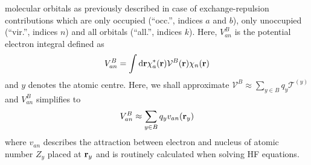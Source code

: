 \documentclass[b5paper,oneside,fleqn,11pt]{book}
\begin{document}
\begin{refsection}
{molecular orbitals as previously described in case of exchange\hyp{}repulsion
contributions}
which are only occupied (``occ.'', indices $a$ and $b$),
only unoccupied (``vir.'', indices $n$) and all orbitals (``all.'', indices $k$).
Here, $V_{an}^{B}$ is the potential electron integral
defined as
%
\begin{equation}  
  V_{an}^{B} =  \int {\rm d}{\bf r} \chi_a^{*} ({\bf r}) \mathcal{V}^{B}({\bf r}) \chi_n ({\bf r})
\end{equation}
%
and $y$ denotes the atomic centre.
Here, we shall approximate $\mathcal{V}^{B}\approx \sum_{y\in B} q_y \mathcal{T}^{(y)}$
and $V_{an}^{B}$ simplifies to
%
\begin{equation}  \label{e:ct-v-qy}
  V_{an}^{B} \approx \sum_{y\in B} q_y v_{an}({\bf r}_y)
\end{equation}
%
where $v_{an}$ describes the attraction between electron and nucleus
of atomic number $Z_y$ placed at ${\bf r}_y$ and
is routinely calculated when solving
HF equations.


\end{refsection}
\end{document}

